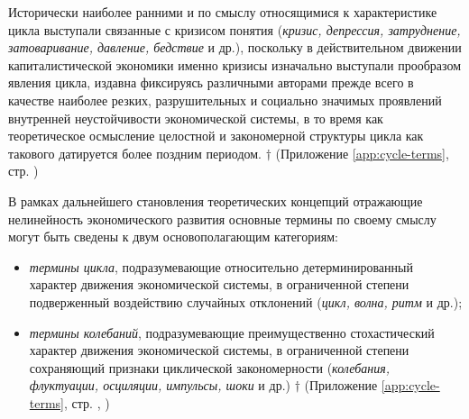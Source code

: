 Исторически наиболее ранними и по смыслу относящимися к характеристике цикла выступали связанные с кризисом понятия (\textit{кризис, депрессия, затруднение, затоваривание, давление, бедствие} и др.), поскольку в действительном движении капиталистической экономики именно кризисы изначально выступали прообразом явления цикла, издавна фиксируясь различными авторами прежде всего в качестве наиболее резких, разрушительных и социально значимых проявлений внутренней неустойчивости экономической системы, в то время как теоретическое осмысление целостной и закономерной структуры цикла как такового датируется более поздним периодом. $\dagger$ (Приложение \ref{app:cycle-terms}, стр. \pageref{tab:crisis-terms})

В рамках дальнейшего становления теоретических концепций отражающие нелинейность экономического развития основные термины по своему смыслу могут быть сведены к двум основополагающим категориям:
\begin{itemize}
    \item \textit{термины цикла}, подразумевающие относительно детерминированный характер движения экономической системы, в ограниченной степени подверженный воздействию случайных отклонений (\textit{цикл, волна, ритм} и др.);
    \item \textit{термины колебаний}, подразумевающие преимущественно стохастический характер движения экономической системы, в ограниченной степени сохраняющий признаки циклической закономерности (\textit{колебания, флуктуации, осциляции, импульсы, шоки} и др.) $\dagger$ (Приложение \ref{app:cycle-terms}, стр. \pageref{tab:cycle-terms}, \pageref{tab:fluctuation-terms})
\end{itemize}

